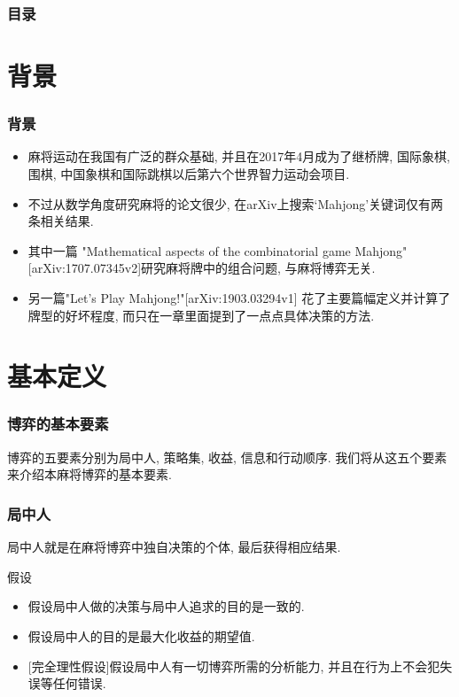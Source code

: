 \documentclass{ctexbeamer}
\title{\TITLE}
\author{\AUTHOR}
\date{\today}
\institute{\INSTITUTE}
\begin{document}

    \begin{frame}
        \titlepage
	\end{frame}
	
	
	\begin{frame}
		\frametitle{目录}
		\tableofcontents
	\end{frame}

	
	\section{背景}

	\begin{frame}
		\frametitle{背景}
		\begin{itemize}
			\item 麻将运动在我国有广泛的群众基础, 并且在2017年4月成为了继桥牌,
				国际象棋, 围棋, 中国象棋和国际跳棋以后第六个世界智力运动会项目.
			\item 不过从数学角度研究麻将的论文很少,
				在arXiv上搜索`Mahjong'关键词仅有两条相关结果.
			\item 其中一篇
				"Mathematical aspects of the combinatorial game Mahjong"
				[arXiv:1707.07345v2]研究麻将牌中的组合问题,
				与麻将博弈无关.
			\item 另一篇"Let's Play Mahjong!"[arXiv:1903.03294v1]
				花了主要篇幅定义并计算了牌型的好坏程度,
				而只在一章里面提到了一点点具体决策的方法.
		\end{itemize}
	\end{frame}

	\section{基本定义}

	\begin{frame}
		\frametitle{博弈的基本要素}
		博弈的五要素分别为局中人, 策略集, 收益, 信息和行动顺序.
		我们将从这五个要素来介绍本麻将博弈的基本要素.
	\end{frame}

	\begin{frame}
		\frametitle{局中人}
		\begin{definition}[局中人]
			局中人就是在麻将博弈中独自决策的个体, 最后获得相应结果.
		\end{definition}
		
		\begin{block}{假设}
			\begin{itemize}
				\item 假设局中人做的决策与局中人追求的目的是一致的.
				\item 假设局中人的目的是最大化收益的期望值.
				\item {[\alert{完全理性假设}]}假设局中人有一切博弈所需的分析能力,
					并且在行为上不会犯失误等任何错误.
			\end{itemize}
		\end{block}
	\end{frame}
\end{document}
